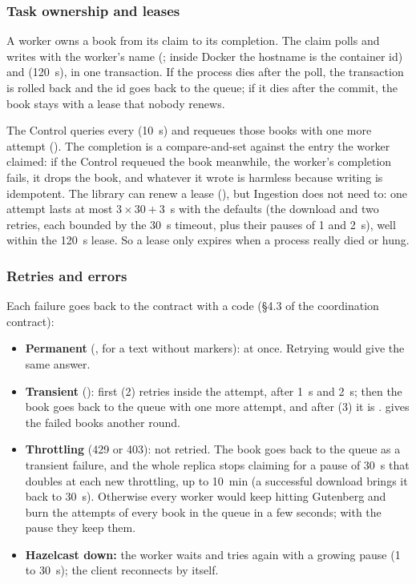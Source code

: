 \subsubsection{Task ownership and leases}
\label{sec:ownership}

A worker owns a book from its claim to its completion. The claim polls  and writes
 with the worker's name (; inside Docker the hostname is the container
id) and  (120~s), in one transaction. If the process dies after the poll, the
transaction is rolled back and the id goes back to the queue; if it dies after the commit, the book stays
 with a lease that nobody renews.

The Control queries  every 
(10~s) and requeues those books with one more attempt (). The completion is a compare-and-set
against the entry the worker claimed: if the Control requeued the book meanwhile, the worker's completion fails, it
drops the book, and whatever it wrote is harmless because writing is idempotent. The library can renew a lease
(), but Ingestion does not need to: one attempt lasts at most $3 \times 30 + 3$~s with the defaults (the download and two retries, each bounded by the
30~s timeout, plus their pauses of 1 and 2~s), well within the 120~s lease. So a lease only expires when a process
really died or hung.

\subsubsection{Retries and errors}

Each failure goes back to the contract with a code (§4.3 of the coordination contract):
\begin{itemize}
  \item \textbf{Permanent} (,  for a text without markers):  at once.
    Retrying would give the same answer.
  \item \textbf{Transient} (): first  (2) retries inside the
    attempt, after 1~s and 2~s; then the book goes back to the queue with one more attempt, and after
     (3) it is .  gives the failed books another round.
  \item \textbf{Throttling} (429 or 403): not retried. The book goes back to the queue as a transient failure, and the
    whole replica stops claiming for a pause of 30~s that doubles at each new throttling, up to 10~min (a successful
    download brings it back to 30~s). Otherwise every worker would keep hitting Gutenberg and burn the attempts of every
    book in the queue in a few seconds; with the pause they keep them.
  \item \textbf{Hazelcast down:} the worker waits and tries again with a growing pause (1 to 30~s); the client
    reconnects by itself.
\end{itemize}

